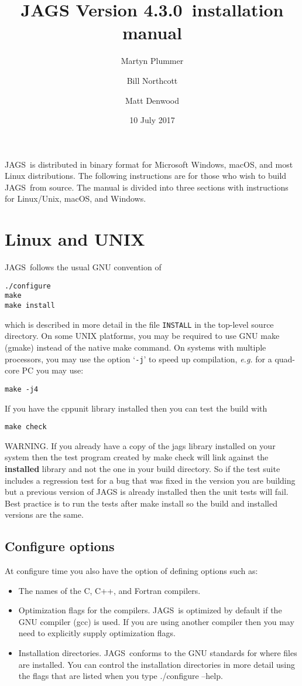 \documentclass[11pt, a4paper, titlepage]{article}
\newcommand{\release}{4.3.0}
\newcommand{\JAGS}{\textsf{JAGS}}
\newcommand{\code}[1]{{\bgroup{\normalfont\ttfamily #1}\egroup}}
\newcommand{\samp}[1]{{`\bgroup\normalfont\texttt{#1}'\egroup}}
\let\command=\code
\let\option=\samp
\begin{document}
\title{JAGS Version \release\ installation manual}
\author{Martyn Plummer \and Bill Northcott \and Matt Denwood}
\date{10 July 2017}
\maketitle

\JAGS\ is distributed in binary format for Microsoft Windows, macOS, 
and most Linux distributions.  The following instructions are for
those who wish to build \JAGS\ from source. The manual is divided
into three sections with instructions for Linux/Unix, macOS, and Windows.

\section{Linux and UNIX}

\JAGS\ follows the usual GNU convention of 
\begin{verbatim}
./configure
make
make install
\end{verbatim}
which is described in more detail in the file \texttt{INSTALL} in
the top-level source directory. On some UNIX platforms, you may
be required to use GNU make (gmake) instead of the native make
command. On systems with multiple processors, you may use the option 
\option{-j} to speed up compilation, {\em e.g.} for a quad-core PC you
may use:
\begin{verbatim}
make -j4
\end{verbatim}
If you have the cppunit library installed then you can test the build with
\begin{verbatim}
make check
\end{verbatim}
WARNING. If you already have a copy of the jags library installed on
your system then the test program created by \code{make check} will
link against the {\bf installed} library and not the one in your build
directory. So if the test suite includes a regression test for a bug
that was fixed in the version you are building but a previous version
of JAGS is already installed then the unit tests will fail. Best
practice is to run the tests after \code{make install} so the build
and installed versions are the same.

\subsection{Configure options}

At configure time you also have the option of defining options such
as:
\begin{itemize}
\item The names of the C, C++, and Fortran compilers.  
\item Optimization flags for the compilers.  \JAGS\ is optimized by
  default if the GNU compiler (gcc) is used. If you are using another
  compiler then you may need to explicitly supply optimization flags.
\item Installation directories. \JAGS\ conforms to the GNU standards
  for where files are installed. You can control the installation
  directories in more detail using the flags that are listed when
  you type \command{./configure --help}.
\end{itemize}
\end{document}
